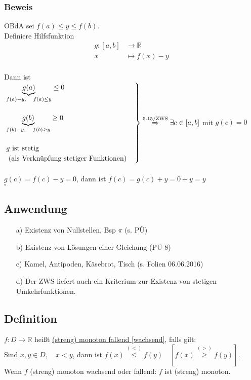 \documentclass[12pt, titlepage]{article}
\newcommand{\R}{\mathds{R}}
\renewenvironment{rcases}{%
	\left.\renewcommand*\lbrace.%
	\begin{cases}}%
	{\end{cases}\right\rbrace}
\renewcommand{\>}{\rightarrow}
\renewcommand{\*}{\cdot}
\begin{document}
	\subsubsection*{Beweis}
	OBdA sei $f(a)\leq y\leq f(b)$.\\
	Definiere Hilfsfunktion
	\begin{align*}
		g\colon[a,b]&\>\R\\
		x&\mapsto f(x)-y
	\end{align*}\\
	Dann ist\\
	$\begin{rcases}
	\underbrace{g(a)}_{f(a)-y,\quad f(a)\leq y}\leq0\\
	\\
	\underbrace{g(b)}_{f(b)-y,\quad f(b)\geq y}\geq0\\
	\\
	g\textrm{ ist stetig}\\
	\textrm{  (als Verknüpfung stetiger Funktionen)}
	\end{rcases}\overset{5.15\textrm{/ZWS}}{\Rightarrow}\exists c\in[a,b]$ mit $g(c)=0$\\
	\\
	$g(c)=f(c)-y=0$, dann ist $f(c)=g(c)+y=0+y=y$\\
	\hspace*{\fill}$\square$
	\subsection{Anwendung}
	\begin{itemize}
		\item[a)] Existenz von Nullstellen, Bsp $\pi$ (s. PÜ)
		\item[b)] Existenz von Lösungen einer Gleichung (PÜ 8)
		\item[c)] Kamel, Antipoden, Käsebrot, Tisch (s. Folien 06.06.2016)
		\item[d)] Der ZWS liefert auch ein Kriterium zur Existenz von stetigen Umkehrfunktionen.
	\end{itemize}
	\subsection{Definition}
	$f\colon D\>\R$ heißt \underline{(streng) monoton fallend [wachsend]}, falls gilt:\\
	Sind $x,y\in D,\quad x<y$, dann ist $f(x)\overset{(<)}{\leq} f(y)\quad[f(x)\overset{(>)}{\geq}f(y)]$.\\
	Wenn $f$ (streng) monoton wachsend oder fallend: $f$ ist (streng) monoton.
\end{document}
